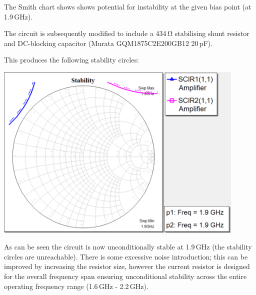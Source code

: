 \documentclass[12pt]{article}
\begin{document}
The Smith chart shows shows potential for instability at the given bias point (at 1.9\,\unit{\giga\hertz}). 

The circuit is subsequently modified to include a 434\,\unit{\ohm} stabilising shunt resistor 
and DC-blocking capacitor (Murata GQM1875C2E200GB12 20\,\unit{\pico\farad}).

\begin{center}
\end{center}

This produces the following stability circles:

\begin{center}
    \includegraphics[width=0.9\textwidth]{2 stability 2.png}
\end{center}

As can be seen the circuit is now unconditionally stable at 1.9\,\unit{\giga\hertz} (the stability circles are unreachable).
There is some excessive noise introduction; this can be improved by increasing the resistor size, 
however the current resistor is designed for the overall frequency span ensuring unconditional stability across the 
entire operating frequency range (1.6\,\unit{\giga\hertz} - 2.2\,\unit{\giga\hertz}).
\end{document}
